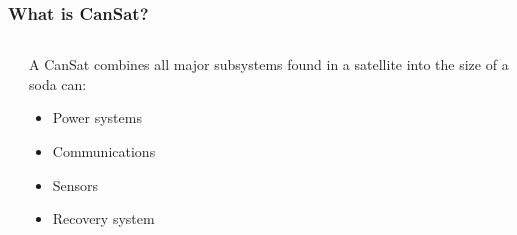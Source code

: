 
\begin{frame}
\frametitle{What is CanSat?}
\begin{columns}[T]
    \begin{column}{0.4\textwidth}
    \end{column}
    \begin{column}{0.6\textwidth}
        \LARGE A CanSat combines all major subsystems found in a satellite into the size of a soda can:\\[1em]
        \normalsize
        \begin{itemize}
            \item Power systems
            \item Communications
            \item Sensors
            \item Recovery system
        \end{itemize}
    \end{column}
\end{columns}
\end{frame}